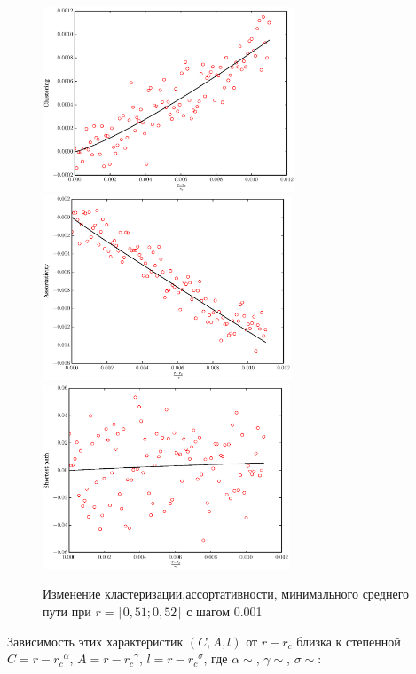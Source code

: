 \documentclass[10pt,aps,pra]{revtex4-1}
\begin{document}
\begin{figure}[H]
\label{fig:flowerParam}
\centering
\includegraphics[height=5.5cm]{pygraph/flowerClustering.eps}
\includegraphics[height=5.5cm]{pygraph/flowerAsort.eps}
\includegraphics[height=5.5cm]{pygraph/flowerShort.eps}
\caption{Изменение кластеризации,ассортативности, минимального среднего пути при $r=\lceil 0,51; 0,52 \rceil$ с шагом 0.001}
\end{figure}

Зависимость этих характеристик $(C,A,l)$ от $r-r_c$ близка к степенной $C = {r-r_c}^\alpha$, $A = {r-r_c}^\gamma$, $l = {r-r_c}^\sigma$, где $\alpha \sim $, $\gamma \sim $, $\sigma \sim $:


\end{document}
